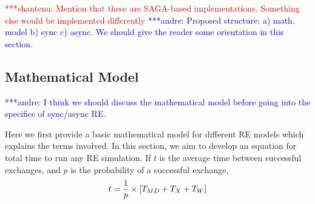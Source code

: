 \documentclass{rspublic}
\newcommand{\jhanote}[1]{ {\textcolor{red} { ***shantenu: #1 }}}
\newcommand{\alnote}[1]{ {\textcolor{blue} { ***andre: #1 }}}
\newcommand{\alnote}[1]{}
\newcommand{\jhanote}[1]{}
\begin{document}



\jhanote{Mention that these are SAGA-based implementations. Something
  else would be implemented differently}
\alnote{Proposed structure: a) math. model b) sync c) async. We should give the reader some orientation in this section.}

\subsection{Mathematical Model}
\alnote{I think we should discuss the mathematical model before going into the specifics of sync/async RE.}

Here we first provide a basic mathematical model for different RE
models which explains the terms involved. In this section, we aim to
develop an equation for total time to run any RE simulation. If $t$ is
the average time between successful exchanges, and $p$ is the
probability of a successful exchange,
\begin{eqnarray}
t=  {1 \over p} \times {[T_{MD} + T_{X} + T_{W}]} 
\label{eq:timebtw}
\end{eqnarray}
\end{document}
